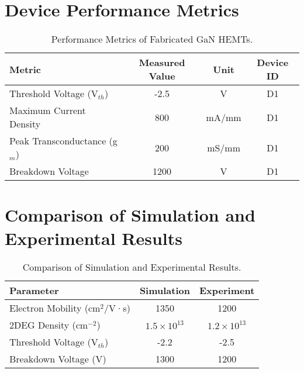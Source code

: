 \section{Device Performance Metrics}

\begin{table}[ht!]
\centering
\caption{Performance Metrics of Fabricated GaN HEMTs.}
\label{tab:device_performance}
\begin{tabular}{@{}lccc@{}}
\toprule
\textbf{Metric}                 & \textbf{Measured Value} & \textbf{Unit} & \textbf{Device ID} \\ \midrule
Threshold Voltage (V$_{th}$)    & -2.5                   & V             & D1                 \\
Maximum Current Density         & 800                    & mA/mm         & D1                 \\
Peak Transconductance (g$_m$)   & 200                    & mS/mm         & D1                 \\
Breakdown Voltage               & 1200                   & V             & D1                 \\ \bottomrule
\end{tabular}
\end{table}

\section{Comparison of Simulation and Experimental Results}

\begin{table}[ht!]
\centering
\caption{Comparison of Simulation and Experimental Results.}
\label{tab:simulation_vs_experiment}
\begin{tabular}{@{}lcc@{}}
\toprule
\textbf{Parameter}              & \textbf{Simulation}     & \textbf{Experiment} \\ \midrule
Electron Mobility (cm$^2$/V·s)  & 1350                   & 1200                \\
2DEG Density (cm$^{-2}$)        & $1.5 \times 10^{13}$   & $1.2 \times 10^{13}$ \\
Threshold Voltage (V$_{th}$)    & -2.2                   & -2.5                \\
Breakdown Voltage (V)           & 1300                   & 1200                \\ \bottomrule
\end{tabular}
\end{table}

